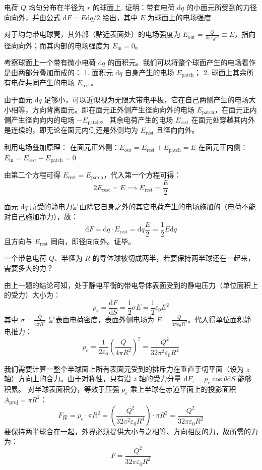 \begin{exercise}\label{ex:15.12}
电荷 $Q$ 均匀分布在半径为 $r$ 的球面上. 证明：带有电荷 $\mathrm{d}q$ 的小面元所受到的力径向向外，并由公式 $\mathrm{d}F = E\mathrm{d}q/2$ 给出，其中 $E$ 为球面上的电场强度.
\end{exercise}
\begin{solution}
对于均匀带电球壳，其外部（贴近表面处）的电场强度为 $E_{\text{out}} = \frac{Q}{4\pi\varepsilon_0 r^2} \equiv E$，指向径向向外；而其内部的电场强度为 $E_{\text{in}} = 0$。

考察球面上一个带有微小电荷 $\mathrm{d}q$ 的面积元。我们可以将整个球面产生的电场看作是由两部分叠加而成的：
1. 面积元 $\mathrm{d}q$ 自身产生的电场 $E_{\text{patch}}$；
2. 球面上其余所有电荷共同产生的电场 $E_{\text{rest}}$。

由于面元 $\mathrm{d}q$ 足够小，可以近似视为无限大带电平板，它在自己两侧产生的电场大小相等，方向背离面元。即在面元正外侧产生径向向外的电场 $E_{\text{patch}}$，在面元正内侧产生径向向内的电场 $-E_{\text{patch}}$。
其余电荷产生的电场 $E_{\text{rest}}$ 在面元处穿越其内外是连续的，即无论在面元内侧还是外侧均为 $E_{\text{rest}}$ 且径向向外。

利用电场叠加原理：
在面元正外侧：$ E_{\text{out}} = E_{\text{rest}} + E_{\text{patch}} = E $
在面元正内侧：$ E_{\text{in}} = E_{\text{rest}} - E_{\text{patch}} = 0 $

由第二个方程可得 $E_{\text{rest}} = E_{\text{patch}}$，代入第一个方程可得：
$$ 2 E_{\text{rest}} = E \implies E_{\text{rest}} = \frac{E}{2} $$

面元 $\mathrm{d}q$ 所受的静电力是由除它自身之外的其它电荷产生的电场施加的（电荷不能对自己施加净力），故：
$$ \mathrm{d}F = \mathrm{d}q \cdot E_{\text{rest}} = \mathrm{d}q \frac{E}{2} = \frac{1}{2} E \mathrm{d}q $$
且方向与 $E_{\text{rest}}$ 同向，即径向向外。证毕。
\end{solution}

\begin{exercise}\label{ex:15.13}
一个带总电荷 $Q$、半径为 $R$ 的导体球被切成两半，若要保持两半球还在一起来，需要多大的力？
\end{exercise}
\begin{solution}
由上一题的结论可知，处于静电平衡的带电导体表面受到的静电压力（单位面积上的受力）大小为：
$$ p_e = \frac{\mathrm{d}F}{\mathrm{d}S} = \frac{1}{2} \sigma E = \frac{1}{2} \varepsilon_0 E^2 $$
其中 $\sigma = \frac{Q}{4\pi R^2}$ 是表面电荷密度，表面外侧电场为 $E = \frac{Q}{4\pi\varepsilon_0 R^2}$。代入得单位面积静电推力：
$$ p_e = \frac{1}{2\varepsilon_0} \left( \frac{Q}{4\pi R^2} \right)^2 = \frac{Q^2}{32\pi^2\varepsilon_0 R^4} $$

我们需要计算一整个半球面上所有表面元受到的排斥力在垂直于切平面（设为 $z$ 轴）方向上的合力。由于对称性，只有沿 $z$ 轴的受力分量 $\mathrm{d}F_z = p_e \cos\theta \mathrm{d}S$ 能够积累。
对半球表面积分，等效于压强 $p_e$ 乘上半球在赤道平面上的投影面积 $A_{\text{proj}} = \pi R^2$：
$$ F_{\text{斥}} = p_e \cdot \pi R^2 = \left( \frac{Q^2}{32\pi^2\varepsilon_0 R^4} \right) \cdot \pi R^2 = \frac{Q^2}{32\pi\varepsilon_0 R^2} $$
要保持两半球合在一起，外界必须提供大小与之相等、方向相反的力，故所需的力为：
$$ F = \frac{Q^2}{32\pi\varepsilon_0 R^2} $$
\end{solution}

